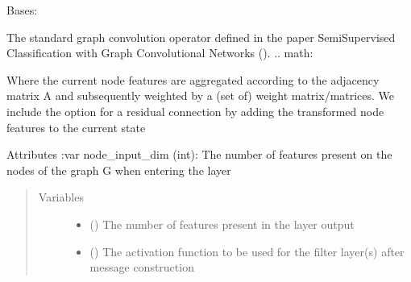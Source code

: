 \documentclass[letterpaper,10pt,english]{sphinxmanual}
\begin{document}

\begin{fulllineitems}
\label{\detokenize{modules/gqcml.nn:gqcml.nn.layers.GraphConv}}
Bases: 

The standard graph convolution operator defined in the paper Semi\sphinxhyphen{}Supervised Classification with Graph Convolutional
Networks ().
.. math:

\begin{sphinxVerbatim}[commandchars=\\\{\}]
  
\end{sphinxVerbatim}

Where the current node features are aggregated according to the adjacency matrix A and subsequently weighted by a (set of)
weight matrix/matrices. We include the option for a  residual connection by adding the transformed node features to the current
state

Attributes
:var node\_input\_dim (int): The number of features present on the nodes of the graph G when entering the layer
\begin{quote}\begin{description}
\item[{Variables}] \leavevmode\begin{itemize}
\item {} 
\sphinxstyleliteralstrong{\sphinxupquote{(}}\sphinxstyleliteralstrong{\sphinxupquote{)}} () \textendash{} The number of features present in the layer output

\item {} 
\sphinxstyleliteralstrong{\sphinxupquote{(}}\sphinxstyleliteralstrong{\sphinxupquote{)}} () \textendash{} The activation function to be used for the filter layer(s) after message construction


\end{itemize}
\end{description}
\end{quote}
\end{fulllineitems}
\end{document}
